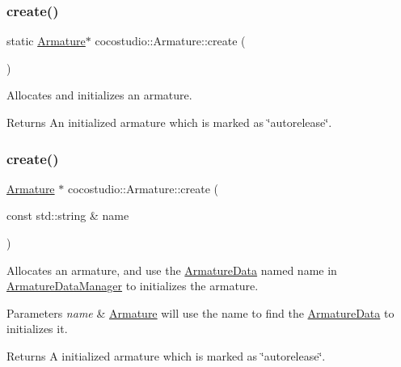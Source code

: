 \subsubsection{\texorpdfstring{create()}{create()}\hspace{0.1cm}{\footnotesize\ttfamily [2/4]}}
{\footnotesize\ttfamily static \hyperlink{classcocostudio_1_1Armature}{Armature}$\ast$ cocostudio\+::\+Armature\+::create (\begin{DoxyParamCaption}{ }\end{DoxyParamCaption})\hspace{0.3cm}{\ttfamily [static]}}

Allocates and initializes an armature. \begin{DoxyReturn}{Returns}
An initialized armature which is marked as \char`\"{}autorelease\char`\"{}. 
\end{DoxyReturn}
\mbox{\label{classcocostudio_1_1Armature_a0d1589fd9a1cb8bd33792ed7acfbcfd1}} 
\subsubsection{\texorpdfstring{create()}{create()}\hspace{0.1cm}{\footnotesize\ttfamily [3/4]}}
{\footnotesize\ttfamily \hyperlink{classcocostudio_1_1Armature}{Armature} $\ast$ cocostudio\+::\+Armature\+::create (\begin{DoxyParamCaption}\item[{const std\+::string \&}]{name }\end{DoxyParamCaption})\hspace{0.3cm}{\ttfamily [static]}}

Allocates an armature, and use the \hyperlink{classcocostudio_1_1ArmatureData}{Armature\+Data} named name in \hyperlink{classcocostudio_1_1ArmatureDataManager}{Armature\+Data\+Manager} to initializes the armature.


\begin{DoxyParams}{Parameters}
{\em name} & \hyperlink{classcocostudio_1_1Armature}{Armature} will use the name to find the \hyperlink{classcocostudio_1_1ArmatureData}{Armature\+Data} to initializes it. \\
\hline
\end{DoxyParams}
\begin{DoxyReturn}{Returns}
A initialized armature which is marked as \char`\"{}autorelease\char`\"{}. 
\end{DoxyReturn}
\mbox{\label{classcocostudio_1_1Armature_a9f461aaafb80e01a6760af5101197702}} 
